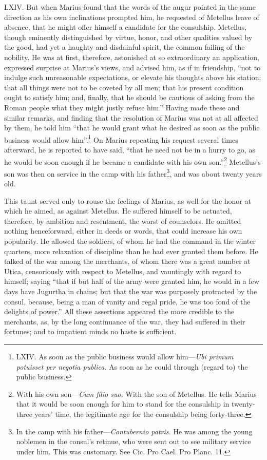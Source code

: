 LXIV. But when Marius found that the words of the augur pointed in the
same direction as his own inclinations prompted him, he requested of
Metellus leave of absence, that he might offer himself a candidate for
the consulship. Metellus, though eminently distinguished by virtue,
honor, and other qualities valued by the good, had yet a haughty and
disdainful spirit, the common failing of the nobility. He was at
first, therefore, astonished at so extraordinary an application,
expressed surprise at Marius's views, and advised him, as if in
friendship, ``not to indulge such unreasonable expectations, or elevate
his thoughts above his station; that all things were not to be coveted
by all men; that his present condition ought to satisfy him; and,
finally, that he should be cautious of asking from the Roman people
what they might justly refuse him.'' Having made these and similar
remarks, and finding that the resolution of Marius was not at all
affected by them, he told him ``that he would grant what he desired as
soon as the public business would allow him''.\footnote{LXIV. As soon as the public business would allow him—\emph{Ubi
primum potuisset per negotia publica.} As soon as he could through
(regard to) the public business.} On Marius repeating
his request several times afterward, he is reported to have said,
``that he need not be in a hurry to go, as he would be soon enough if
he became a candidate with his own son.''\footnote{With his own son—\emph{Cum filio suo.} With the son of Metellus.
He tells Marius that it would be soon enough for him to stand for
the consulship in twenty-three years' time, the legitimate age for
the consulship being forty-three.} Metellus's son was then
on service in the camp with his father\footnote{In the camp with his father—\emph{Contubernio patris.} He was
among the young noblemen in the consul's retinue, who were sent out
to see military service under him. This was customary. See Cic. Pro
Cael. Pro Planc. 11.}, and was about twenty
years old.

This taunt served only to rouse the feelings of Marius, as well for
the honor at which he aimed, as against Metellus. He suffered himself
to be actuated, therefore, by ambition and resentment, the worst of
counselors. He omitted nothing henceforward, either in deeds or words,
that could increase his own popularity. He allowed the soldiers, of
whom he had the command in the winter quarters, more relaxation of
discipline than he had ever granted them before. He talked of the war
among the merchants, of whom there was a great number at Utica,
censoriously with respect to Metellus, and vauntingly with regard to
himself; saying ``that if but half of the army were granted him, he
would in a few days have Jugurtha in chains; but that the war was
purposely protracted by the consul, because, being a man of vanity and
regal pride, he was too fond of the delights of power.'' All these
assertions appeared the more credible to the merchants, as, by the
long continuance of the war, they had suffered in their fortunes; and
to impatient minds no haste is sufficient.

